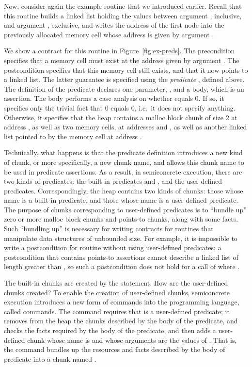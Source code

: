 \documentclass{CSML}
\theoremstyle{definition}\newtheorem{notation}[thm]{Notation}
\theoremstyle{plain}\newtheorem{satz}[thm]{Satz}
\begin{document}
Now, consider again the example routine  that 
we introduced earlier. Recall that this routine builds a linked 
list holding the values between argument , 
inclusive, and argument , exclusive, and writes the 
address of the first node into the previously allocated memory 
cell whose address is given by argument . 

We show a contract for this routine in Figure~\ref{fig:ex-preds}. The precondition 
specifies that a memory cell must exist at the address given by 
argument . The postcondition specifies that 
this memory cell still exists, and that it now points to a 
linked list. The latter guarantee is specified using the 
\emph{predicate} , defined above. The definition 
of the predicate declares one parameter, , and a body, which is an assertion. The body 
performs a case analysis on whether  equals 
0. If so, it specifies only the trivial fact that 0 
equals 0, i.e.~it does not specify anything. Otherwise, it 
specifies that the heap contains a malloc block chunk of size 2 
at address , as well as two memory cells, at 
addresses  and , as well as another 
linked list pointed to by the memory cell at address 
.

Technically, what happens is that the predicate definition 
introduces a new kind of chunk, or more specifically, a new 
chunk name, and allows this chunk name to be used in predicate 
assertions. As a result, in semiconcrete execution, there are 
two kinds of predicates: the built-in predicates  
and , and the user-defined predicates. 
Correspondingly, the heap contains two kinds of chunks: those 
whose name is a built-in predicate, and those whose name is a 
user-defined predicate. The purpose of chunks corresponding to 
user-defined predicates is to ``bundle up'' zero or more malloc 
block chunks and points-to chunks, along with some facts. Such 
``bundling up'' is necessary for writing contracts for routines 
that manipulate data structures of unbounded size. For example, 
it is impossible to write a postcondition for routine 
 without using user-defined predicates: a postcondition
that contains  points-to assertions cannot describe a linked list
of length greater than , so such a postcondition does not hold for a call of  where .

The built-in chunks are created by the  
statement. How are the user-defined chunks created? To enable 
the creation of user-defined chunks, semiconcrete execution 
introduces a new form of commands into the programming 
language, called  commands. The command 
 requires that  is a user-defined 
predicate; it removes from the heap the chunks described by the 
body of the predicate, and checks the facts required by the body of the predicate,
and then adds a user-defined chunk whose name 
is  and whose arguments are the values of . That 
is, the command bundles up the resources and facts described by 
the body of predicate  into a chunk named .
\end{document}

